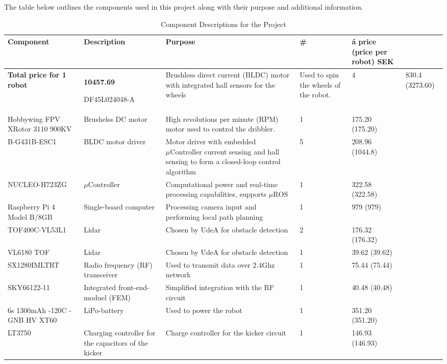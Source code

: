 \documentclass[a4paper,8pt]{article}
\begin{document}
  The table below outlines the components used in this project along
  with their purpose and additional information.
  \begin{center}
    \begin{longtable}{|p{3cm}|p{3cm}|p{3cm}|p{1cm}|p{3cm}| }
      \caption{Component Descriptions for the Project}
      \\ \hline {} \textbf{Component} & \textbf{Description} & \textbf{Purpose} & \textbf{\#} & \textbf{á price (price per robot) SEK}\\ \endhead \hline

       \textbf{Total price for 1 robot} & \textbf{10457.69} \endlastfoot \hline

      DF45L024048-A & Brushless direct current (BLDC) motor with integrated hall sensors for the wheels & Used to spin the wheels of the robot. & 4 & 830.4 (3273.60)\\ \hline 
      Hobbywing FPV XRotor 3110 900KV & Brushelss DC motor & High revolutions per minute (RPM) motor used to control the dribbler. & 1 & 175.20 (175.20) \\ \hline 
      B-G431B-ESC1 & BLDC motor driver & Motor driver with embedded $\mu\text{Controller}$ current sensing and hall sensing to form a closed-loop control algorithm & 5 & 208.96 (1044.8) \\ \hline 
      NUCLEO-H723ZG & $\mu\text{Controller}$ & Computational power and real-time processing capabilities, supports $\mu\text{ROS}$ & 1 & 322.58 (322.58) \\ \hline 
      Raspberry Pi 4 Model B/8GB & Single-board computer & Processing camera input and performing local path planning & 1 & 979 (979) \\ \hline
      TOF400C-VL53L1 & Lidar & Chosen by UdeA for obstacle detection & 2 & 176.32 (176.32) \\ \hline
      VL6180 TOF & Lidar & Chosen by UdeA for obstacle detection & 1 & 39.62 (39.62) \\ \hline
      SX1280IMLTRT & Radio frequency (RF) transceiver & Used to transmit data over 2.4Ghz network & 1 & 75.44 (75.44) \\ \hline 
      SKY66122-11 & Integrated front-end-moduel (FEM) & Simplified integration with the RF circuit & 1 & 40.48 (40.48) \\ \hline 
      6s 1300mAh -120C - GNB HV XT60 & LiPo-battery & Used to power the robot & 1 & 351.20 (351.20) \\ \hline 
      LT3750 & Charging controller for the capacitors of the kicker & Charge controller for the kicker circuit & 1 & 146.93 (146.93)\\ \hline 

\end{longtable}
\end{center}
\end{document}

